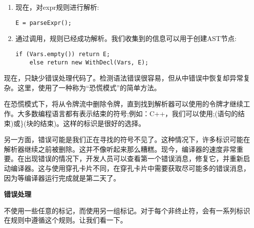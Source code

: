 \begin{enumerate}
\item 现在，对expr规则进行解析:
\begin{lstlisting}[caption={}]
	E = parseExpr();
\end{lstlisting}

\item 通过调用，规则已经成功解析。我们收集到的信息可以用于创建AST节点:
\begin{lstlisting}[caption={}]
	if (Vars.empty()) return E;
	else return new WithDecl(Vars, E);
\end{lstlisting}
\end{enumerate}

现在，只缺少错误处理代码了。检测语法错误很容易，但从中错误中恢复却异常复杂。这里，使用了一种称为“恐慌模式”的简单方法。\par

在恐慌模式下，将从令牌流中删除令牌，直到找到解析器可以使用的令牌才继续工作。大多数编程语言都有表示结束的符号;例如：C++，我们可以使用;(语句的结束)或\}(块的结束)。这样的标识是很好的选择。\par

另一方面，错误可能是我们正在寻找的符号不见了。这种情况下，许多标识可能在解析器继续之前被删除。这并不像听起来那么糟糕。现今，编译器的速度非常重要。在出现错误的情况下，开发人员可以查看第一个错误消息，修复它，并重新启动编译器。这与使用穿孔卡片不同，在穿孔卡片中需要获取尽可能多的错误消息，因为等编译器运行完成就是第二天了。\par

\hspace*{\fill} \par %
\textbf{错误处理}

不使用一些任意的标记，而使用另一组标记。对于每个非终止符，会有一系列标识在规则中遵循这个规则。让我们看一下。\par


